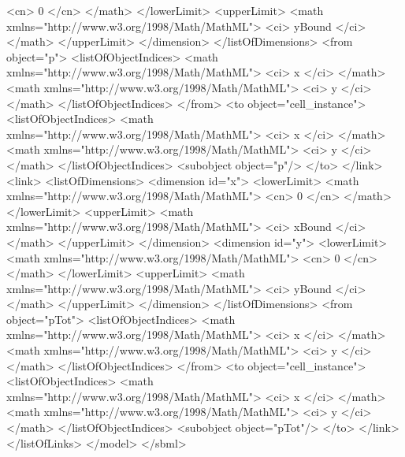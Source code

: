 \documentclass{cekarticle}
\begin{document}
\begin{example}
                            <cn> 0 </cn>
                        </math>
                    </lowerLimit>
                    <upperLimit>
                        <math xmlns="http://www.w3.org/1998/Math/MathML">
                            <ci> yBound </ci>
                        </math>
                    </upperLimit>
                </dimension>
            </listOfDimensions>
            <from object="p">
                <listOfObjectIndices>
                    <math xmlns="http://www.w3.org/1998/Math/MathML">
                        <ci> x </ci>
                    </math>
                    <math xmlns="http://www.w3.org/1998/Math/MathML">
                        <ci> y </ci>            
                    </math>
                </listOfObjectIndices>
            </from>
            <to object="cell_instance">
                <listOfObjectIndices>
                    <math xmlns="http://www.w3.org/1998/Math/MathML">
                        <ci> x </ci>
                    </math>
                    <math xmlns="http://www.w3.org/1998/Math/MathML">
                        <ci> y </ci>            
                    </math>
                </listOfObjectIndices>
                <subobject object="p"/>
            </to>
        </link>
        <link>
            <listOfDimensions>
                <dimension id="x">
                    <lowerLimit>
                        <math xmlns="http://www.w3.org/1998/Math/MathML">
                            <cn> 0 </cn>
                        </math>
                    </lowerLimit>
                    <upperLimit>
                        <math xmlns="http://www.w3.org/1998/Math/MathML">
                            <ci> xBound </ci>
                        </math>
                    </upperLimit>
                </dimension>
                <dimension id="y">
                    <lowerLimit>
                        <math xmlns="http://www.w3.org/1998/Math/MathML">
                            <cn> 0 </cn>
                        </math>
                    </lowerLimit>
                    <upperLimit>
                        <math xmlns="http://www.w3.org/1998/Math/MathML">
                            <ci> yBound </ci>
                        </math>
                    </upperLimit>
                </dimension>
            </listOfDimensions>
            <from object="pTot">
                <listOfObjectIndices>
                    <math xmlns="http://www.w3.org/1998/Math/MathML">
                        <ci> x </ci>
                    </math>
                    <math xmlns="http://www.w3.org/1998/Math/MathML">
                        <ci> y </ci>            
                    </math>
                </listOfObjectIndices>
            </from>
            <to object="cell_instance">
                <listOfObjectIndices>
                    <math xmlns="http://www.w3.org/1998/Math/MathML">
                        <ci> x </ci>
                    </math>
                    <math xmlns="http://www.w3.org/1998/Math/MathML">
                        <ci> y </ci>            
                    </math>
                </listOfObjectIndices>
                <subobject object="pTot"/>
            </to>
        </link>
    </listOfLinks>
</model>
</sbml>


\end{example}
\end{document}
